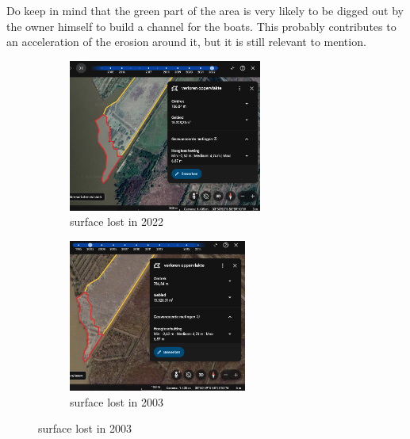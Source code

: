  Do keep in mind that the green part of the area is very likely to be digged out by the owner himself to build a channel for the boats. This probably contributes to an acceleration of the erosion around it, but it is still relevant to mention.
 
\begin{figure}[H]
    \centering
    \begin{subfigure}[b]{0.48\textwidth}
        \includegraphics[width=\linewidth, height =5cm]{figures/appendix-g/verlorenopp2022.png}
        \caption{surface lost in 2022}
        \label{fig:second}
    \end{subfigure}
    \hfill
    \begin{subfigure}[b]{0.48\textwidth}
        \includegraphics[width=\linewidth, height =5cm]{figures/appendix-g/verlorenopp2003.png}
        \caption{surface lost in 2003}
        \label{fig:second}
    \end{subfigure}
    

    \vspace{0.5cm}


\end{figure}
